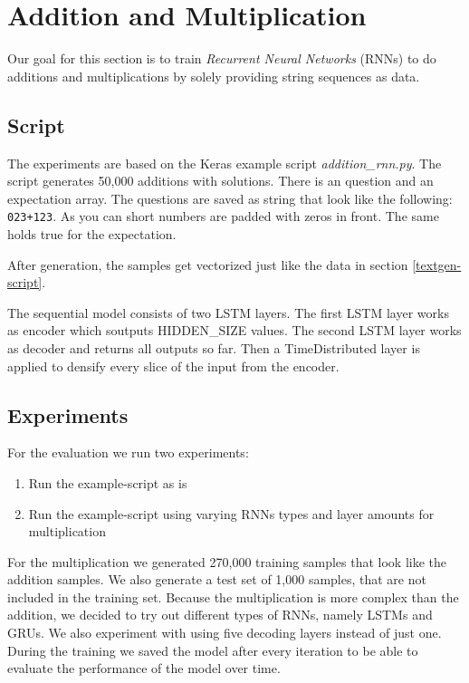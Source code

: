 \documentclass{article}[]
\begin{document}
\section{Addition and Multiplication}
\label{sec:rnn}
Our goal for this section is to train \emph{Recurrent Neural Networks} (RNNs) to do additions and multiplications by solely providing string sequences as data.

\subsection{Script}
The experiments are based on the Keras example script \textit{addition\_rnn.py}\cite{kerasexamples}.
The script generates 50,000 additions with solutions.
There is an question and an expectation array.
The questions are saved as string that look like the following:
\texttt{023+123}.
As you can short numbers are padded with zeros in front.
The same holds true for the expectation.

After generation, the samples get vectorized just like the data in section \ref{textgen-script}.


The sequential model consists of two LSTM layers.
The first LSTM layer works as encoder which soutputs HIDDEN\_SIZE values.
The second LSTM layer works as decoder and returns all outputs so far.
Then a TimeDistributed layer is applied to densify every slice of the input from the encoder.

\subsection{Experiments}
For the evaluation we run two experiments:
\begin{enumerate}
	\item{Run the example-script as is}
	\item{Run the example-script using varying RNNs types and layer amounts for multiplication}
\end{enumerate}

For the multiplication we generated 270,000 training samples that look like the addition samples.
We also generate a test set of 1,000 samples, that are not included in the training set.
Because the multiplication is more complex than the addition, we decided to try out different types of RNNs, namely LSTMs and GRUs.
We also experiment with using five decoding layers instead of just one.
During the training we saved the model after every iteration to be able to evaluate the performance of the model over time.
\end{document}
